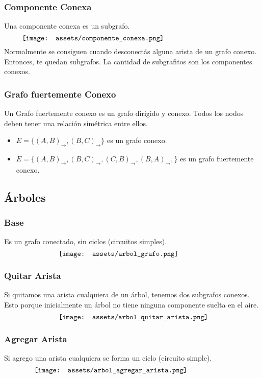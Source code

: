 \documentclass[10pt,a4paper]{article}
\begin{document}
\subsubsection*{Componente Conexa}
Una componente conexa es un subgrafo.
\[\begin{minipage}[b]{0.9\textwidth}
    \texttt{[image: assets/componente\_conexa.png]}
\end{minipage}\]
Normalmente se consiguen cuando desconectás alguna arista de un grafo conexo. Entonces, te quedan subgrafos. La cantidad de subgrafitos son los componentes conexos.
\subsubsection*{Grafo fuertemente Conexo}
Un Grafo fuertemente conexo es un grafo dirigido y conexo. Todos los nodos deben tener una relación simétrica entre ellos.
\begin{itemize}
    \item $E = \{(A,B)_{\rightarrow}, (B, C)_{\rightarrow}\}$ es un grafo conexo.
    \item $E = \{(A, B)_{\rightarrow}, (B, C)_{\rightarrow}, (C, B)_{\rightarrow}, (B, A)_{\rightarrow},\}$ es un grafo fuertemente conexo.
\end{itemize}
\subsection*{Árboles}
\subsubsection*{Base}
Es un grafo conectado, sin ciclos (circuitos simples).
\[\begin{minipage}[b]{0.6\textwidth}
    \texttt{[image: assets/arbol\_grafo.png]}
\end{minipage}\]
\subsubsection*{Quitar Arista}
Si quitamos una arista cualquiera de un árbol, tenemos dos subgrafos conexos. Esto porque inicialmente un árbol no tiene ninguna componente suelta en el aire. 
\[\begin{minipage}[b]{0.6\textwidth}
    \texttt{[image: assets/arbol\_quitar\_arista.png]}
\end{minipage}\]
\subsubsection*{Agregar Arista}
Si agrego una arista cualquiera se forma un ciclo (circuito simple).
\[\begin{minipage}[b]{0.8\textwidth}
    \texttt{[image: assets/arbol\_agregar\_arista.png]}
\end{minipage}\]
\end{document}
